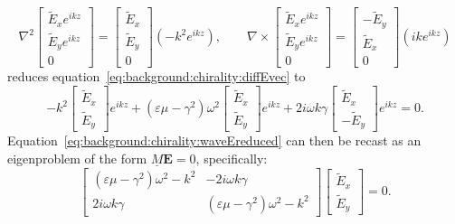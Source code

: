 \begin{equation}
    \nabla^2 
    \begin{bmatrix}
        \tilde E_x e^{i k z}\\ 
        \tilde E_y e^{i k z} \\
        0 
    \end{bmatrix} 
    = 
    \begin{bmatrix} 
        \tilde E_x \\ 
        \tilde E_y \\ 
        0 
    \end{bmatrix} 
    (-k^2 e^{i k z}), \qquad
    \nabla \times
    \begin{bmatrix}
        \tilde E_x e^{i k z}\\ 
        \tilde E_y e^{i k z} \\
        0 
    \end{bmatrix} 
    = 
    \begin{bmatrix} 
        -\tilde E_y \\ 
        \tilde E_x \\ 
        0 
    \end{bmatrix} 
    (i k e^{i k z}) 
\end{equation}
reduces equation~\ref{eq:background:chirality:diffEvec} to
\begin{equation}\label{eq:background:chirality:waveEreduced}
    -k^2 \begin{bmatrix}\tilde E_x\\ \tilde E_y\end{bmatrix} e^{i k z} + (\varepsilon \mu - \gamma^2)\omega^2 \begin{bmatrix}\tilde E_x\\ \tilde E_y\end{bmatrix} e^{i k z} + 2 i \omega k \gamma \begin{bmatrix}\tilde E_x\\ -\tilde E_y\end{bmatrix} e^{i k z} = 0.
\end{equation}
Equation~\ref{eq:background:chirality:waveEreduced} can then be recast as an eigenproblem of the form $\underline{M}\mathbf{E} = 0$, specifically:
\begin{equation}
    \begin{bmatrix}
		(\varepsilon \mu - \gamma^2)\omega^2 -k^2  & -2 i \omega k \gamma \\ 
		2 i \omega k \gamma & (\varepsilon \mu - \gamma^2)\omega^2 -k^2
    \end{bmatrix}
    \begin{bmatrix} 
        \tilde E_x \\ 
        \tilde E_y
    \end{bmatrix} 
    = 0.
\end{equation}
